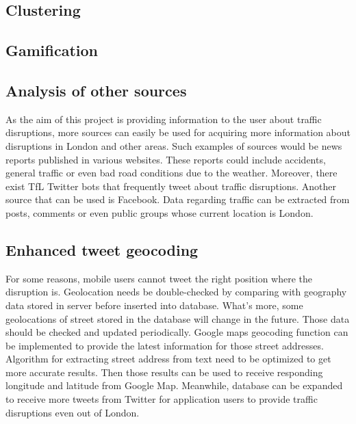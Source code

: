 \subsection{Clustering}

\subsection{Gamification}

\subsection{Analysis of other sources}
As the aim of this project is providing information to the user about traffic disruptions, more sources can 
easily be used for acquiring more information about disruptions in London and other areas. Such examples 
of sources would be news reports published in various websites. These reports could include accidents, general traffic or even 
bad road conditions due to the weather. Moreover, there exist TfL Twitter bots that frequently tweet
about traffic disruptions. Another source that can be used is Facebook. Data regarding traffic can be
extracted from posts, comments or even public groups whose current location is London.

\subsection{Enhanced tweet geocoding}
For some reasons, mobile users cannot tweet the right position where the disruption is. Geolocation needs be double-checked by comparing with geography data stored in server before inserted into database. What's more, some geolocations of street stored in the database will change in the future. Those data should be checked and updated periodically. Google maps geocoding function can be implemented to provide the latest information for those street addresses. Algorithm for extracting street address from text need to be optimized to get more accurate results. Then those results can be used to receive responding longitude and latitude from Google Map. Meanwhile, database can be expanded to receive more tweets from Twitter for application users to provide traffic disruptions even out of London.